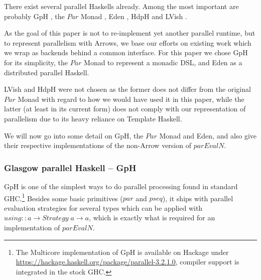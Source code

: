 \documentclass{jfp1}
\newcommand{\Conid}[1]{\mathit{#1}}
\newcommand{\Varid}[1]{\mathit{#1}}
\renewcommand{\cite}[1]{\citep{#1}}
\begin{document}
There exist several parallel Haskells already. Among the most important are probably GpH \citep[based on \ensuremath{\Varid{par}} and \ensuremath{\Varid{pseq}} \enquote{hints},][]{Trinder1996,Trinder1998a}, the \ensuremath{\Conid{Par}} Monad \citep[a monad for deterministic parallelism,][]{par-monad,Foltzer:2012:MPC:2398856.2364562}, Eden \citep[a parallel Haskell for distributed memory,][]{eden,Loogen2012}, HdpH \citep[a Template Haskell-based parallel Haskell for distributed memory,][]{Maier:2014:HDS:2775050.2633363,stewart_maier_trinder_2016} and LVish \citep[a \ensuremath{\Conid{Par}} extension with focus on communication,][]{Kuper:2014:TPE:2666356.2594312}.

As the goal of this paper is not to re-implement yet another parallel runtime, but to represent parallelism with Arrows, we base our efforts on existing work which we wrap as backends behind a common interface. For this paper we chose GpH for its simplicity, the \ensuremath{\Conid{Par}} Monad to represent a monadic DSL, and Eden as a distributed parallel Haskell.

LVish and HdpH were not chosen as the former does not differ from the original \ensuremath{\Conid{Par}} Monad with regard to how we would have used it in this paper, while the latter (at least in its current form) does not comply with our representation of parallelism due to its heavy reliance on Template Haskell.

We will now go into some detail on GpH, the \ensuremath{\Conid{Par}} Monad and Eden, and also give their respective implementations of the non-Arrow version of \ensuremath{\Varid{parEvalN}}.


\subsubsection{Glasgow parallel Haskell -- GpH}
\label{sec:GpHIntro}
GpH \cite{Marlow2009,Trinder1998a} is one of the simplest ways to do parallel processing found in standard GHC.\footnote{The Multicore implementation of GpH is available on Hackage under \url{https://hackage.haskell.org/package/parallel-3.2.1.0}, compiler support is integrated in the stock GHC.} Besides some basic primitives (\ensuremath{\Varid{par}} and \ensuremath{\Varid{pseq}}), it ships with parallel evaluation strategies for several types which can be applied with \ensuremath{\Varid{using}\mathbin{::}\Varid{a}\to \Conid{Strategy}\;\Varid{a}\to \Varid{a}}, which is exactly what is required for an implementation of \ensuremath{\Varid{parEvalN}}.
\end{document}
